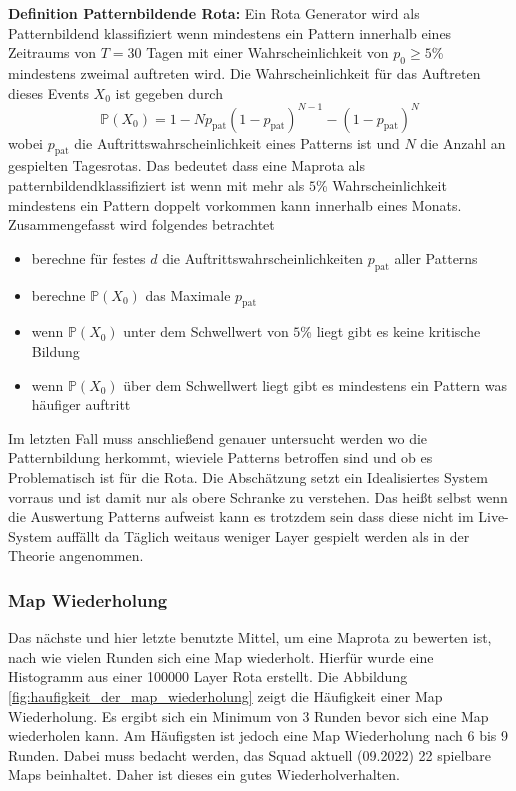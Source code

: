         \textbf{Definition Patternbildende Rota:}
        Ein Rota Generator wird als \glqq Patternbildend \grqq klassifiziert wenn mindestens ein Pattern innerhalb eines Zeitraums 
        von $T = 30$ Tagen mit einer Wahrscheinlichkeit von $p_0 \geq 5$\% mindestens zweimal auftreten wird. 
        Die Wahrscheinlichkeit für das Auftreten dieses Events $ X_0 $ ist gegeben durch
        \begin{equation}
            \mathbb{P}(X_0) = 1-N p_\text{pat}(1-p_\text{pat})^{N-1}-(1-p_\text{pat})^N
        \end{equation}
        wobei $p_\text{pat}$ die Auftrittswahrscheinlichkeit eines Patterns ist und $N$ die Anzahl an
        gespielten Tagesrotas. Das bedeutet dass eine Maprota als \glqq patternbildend\grqq klassifiziert
        ist wenn mit mehr als $5$\% Wahrscheinlichkeit mindestens ein Pattern doppelt vorkommen
        kann innerhalb eines Monats.
        Zusammengefasst wird folgendes betrachtet 
        \begin{itemize}
            \item berechne für festes $d$ die Auftrittswahrscheinlichkeiten $p_\text{pat}$ aller Patterns
            \item berechne $\mathbb{P}(X_0)$ das Maximale $p_\text{pat}$ 
            \item wenn $\mathbb{P}(X_0)$ unter dem Schwellwert von $5$\% liegt gibt es keine kritische Bildung
            \item wenn $\mathbb{P}(X_0)$ über dem Schwellwert liegt gibt es mindestens ein Pattern was häufiger auftritt
        \end{itemize}
        Im letzten Fall muss anschließend genauer untersucht werden wo die Patternbildung herkommt, wieviele Patterns betroffen sind und ob es Problematisch ist für die Rota. 
        Die Abschätzung setzt ein Idealisiertes System vorraus und ist damit nur als obere Schranke zu verstehen. 
        Das heißt selbst wenn die Auswertung Patterns aufweist kann es trotzdem sein dass diese nicht im Live-System auffällt da Täglich weitaus weniger Layer gespielt werden als in der Theorie angenommen.

        \subsubsection{Map Wiederholung}
            Das nächste und hier letzte benutzte Mittel, um eine Maprota zu bewerten ist, nach wie vielen Runden sich eine Map
            wiederholt. Hierfür wurde eine Histogramm aus einer 100000 Layer Rota erstellt.
            Die Abbildung \ref{fig:haufigkeit_der_map_wiederholung} zeigt die Häufigkeit einer Map Wiederholung. Es ergibt sich ein
            Minimum von 3 Runden bevor sich eine Map wiederholen kann. Am Häufigsten ist jedoch eine Map Wiederholung nach 6 bis 9 Runden.
            Dabei muss bedacht werden, das Squad aktuell (09.2022) 22 spielbare Maps beinhaltet. Daher ist dieses ein gutes Wiederholverhalten.

